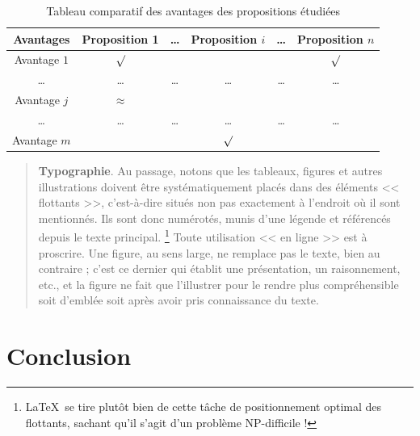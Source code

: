 \documentclass[11pt, french]{report-rd-info}
\newenvironment{typographie}{\begin{quote}\textbf{Typographie}. }{\end{quote}}
\begin{document}
\begin{table} %
    \begin{center}
        \begin{tabular}{|c||c|c|c|c|c|}
            \hline
            Avantages    & Proposition 1 & \ldots & Proposition $i$ & \ldots & Proposition $n$ \\
            \hline
            \hline
            Avantage $1$ & $\surd$       &        &                 &        & $\surd$         \\
            \hline
            \ldots       & \ldots        & \ldots & \ldots          & \ldots & \ldots          \\
            \hline
            Avantage $j$ & $\approx$     &        &                 &        &                 \\
            \hline
            \ldots       & \ldots        & \ldots & \ldots          & \ldots & \ldots          \\
            \hline
            Avantage $m$ &               &        & $\surd$         &        &                 \\
            \hline
        \end{tabular}
    \end{center}
    \caption{Tableau comparatif des avantages des propositions étudiées}
    \label{tab:ComparatifAlternatif}
\end{table}

\begin{typographie}
Au passage, notons que les tableaux, figures et autres illustrations doivent être systématiquement placés dans des éléments << flottants >>, c'est-à-dire situés non pas exactement à l'endroit où il sont mentionnés. Ils sont donc numérotés, munis d'une légende et référencés depuis le texte principal.%
\footnote{\LaTeX\ se tire plutôt bien de cette tâche de positionnement optimal des flottants, sachant qu'il s'agit d'un problème NP-difficile !}
Toute utilisation << en ligne >> est à proscrire. Une figure, au sens large, ne remplace pas le texte, bien au contraire ; c'est ce dernier qui établit une présentation, un raisonnement, etc., et la figure ne fait que l'illustrer pour le rendre plus compréhensible soit d'emblée soit après avoir pris connaissance du texte.
\end{typographie}

\section{Conclusion}
\end{document}
